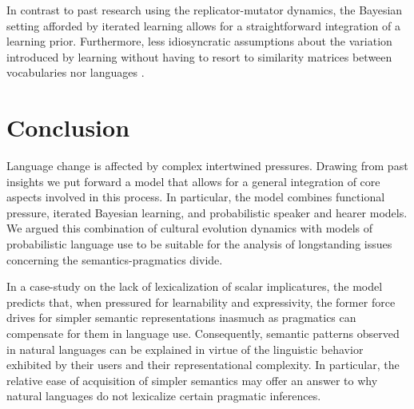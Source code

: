 \documentclass[a4paper]{article}
\begin{document}
In contrast to past research using the replicator-mutator dynamics, the Bayesian setting afforded by iterated learning allows for a straightforward integration of a learning prior. Furthermore, less idiosyncratic assumptions about the variation introduced by learning without having to resort to similarity matrices between vocabularies \citep{nowak+krakauer:1999} nor languages \citep{nowak+etal:2002}.

\section{Conclusion}
Language change is affected by complex intertwined pressures. Drawing from past insights we put forward a model that allows for a general integration of core aspects involved in this process. In particular, the model combines functional pressure, iterated Bayesian learning, and probabilistic speaker and hearer models. We argued this combination of cultural evolution dynamics with models of probabilistic language use to be suitable for the analysis of longstanding issues concerning the semantics-pragmatics divide. 

In a case-study on the lack of lexicalization of scalar implicatures, the model predicts that,  when  pressured for learnability and expressivity, the former force drives for simpler semantic representations inasmuch as pragmatics can compensate for them in language use. Consequently, semantic patterns observed in natural languages can be explained in  virtue of the linguistic behavior exhibited by their users and their representational complexity. In particular, the relative ease of acquisition of simpler semantics may offer an answer to why natural languages do not lexicalize certain pragmatic inferences.
\end{document}
